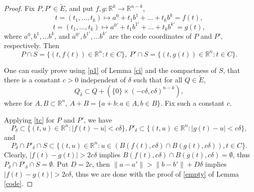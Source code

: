 \documentclass[a4paper]{amsart}
\theoremstyle{definition} \newtheorem{remark}[theorem]{Remark}
\def\rr{{\mathbb R}}
\def\R{{\mathbb R}}
\def\su{\subset}
\def\de{\delta}
\def\ti{\widetilde}
\begin{document}
\begin{proof}
Fix $P, P' \in \ti{E}$, and %
put $f,g: \rr^k \to \rr^{n-k}$, 
$$ t=(t_1,\dots,t_k) \mapsto a^0+t_1b^1+\dots+t_kb^k=f(t), $$
$$t=(t_1,\dots,t_k) \mapsto a^{0'}+t_1b^{1'}+\dots+t_kb^{k'}=g(t),$$ where 
$a^0,b^1,\dots b^k$, and $a^{0'},b^{1'},\dots b^{k'}$ are the code coordinates of $P$ and $P'$, respectively. 
Then
$$P \cap S = \{(t,f(t)) \in \rr^n \colon t \in C \}, \ P' \cap S = \{(t,g(t)) \in \rr^n \colon t \in C \}.$$ 

One can easily prove using \eqref{p1} of Lemma \ref{ci} and the compactness of $S$, that 
there is a constant $c>0$ independent of $\de$ such that for all $Q \in \ti{E}$, 
\begin{equation}
\label{tc}
Q_\de \su Q+ \left(\{0\} \times (-c\de,c\de)^{n-k} \right),
\end{equation}
where for $A,B \su \rr^n$, $A+B=\{a+b \colon a \in A, b \in B \}$. Fix such a constant $c$. 


Applying \eqref{tc} for $P$ and $P'$, we have
$$P_{\de} \su \{(t,u) \in \R^n \colon |f(t)-u| < c\de \}, 
P'_{\de} \su \{(t,u) \in \R^n \colon |g(t)-u| < c\de \},$$
and
\begin{equation}
\label{ball}
P_{\de} \cap P'_{\de} \cap S  \su \{(t,u) \in \R^n \colon u \in (B(f(t),c\de) \cap B(g(t),c\de)), t \in C \}.
\end{equation} 
Clearly, $|f(t)-g(t)|>2 c \de$ implies $B(f(t),c\de) \cap B(g(t),c\de)=\emptyset$, thus  $P_{\de} \cap P'_{\de} \cap S =\emptyset$. 
Put $D=2 c$, then $\| a-a' \|  > \| b - b' \| + D \de $ implies $|f(t)-g(t)|>2 c \de$, thus we are done with the proof of \eqref{empty} of Lemma \ref{code}.


\end{proof}
\end{document}
